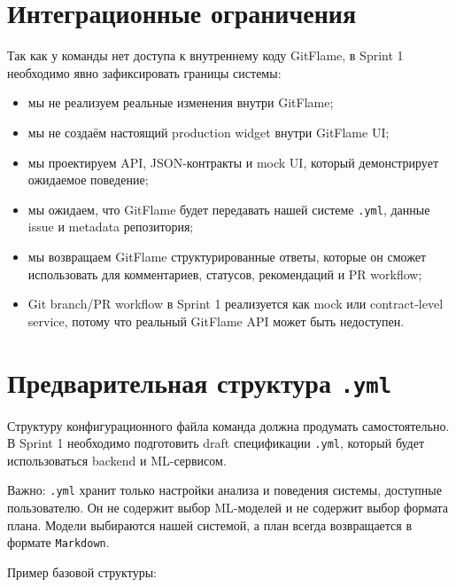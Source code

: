 \documentclass[12pt,a4paper]{article}
\begin{document}
\section{Интеграционные ограничения}

Так как у команды нет доступа к внутреннему коду GitFlame, в Sprint 1 необходимо явно зафиксировать границы системы:

\begin{itemize}
    \item мы не реализуем реальные изменения внутри GitFlame;
    \item мы не создаём настоящий production widget внутри GitFlame UI;
    \item мы проектируем API, JSON-контракты и mock UI, который демонстрирует ожидаемое поведение;
    \item мы ожидаем, что GitFlame будет передавать нашей системе \texttt{.yml}, данные issue и metadata репозитория;
    \item мы возвращаем GitFlame структурированные ответы, которые он сможет использовать для комментариев, статусов, рекомендаций и PR workflow;
    \item Git branch/PR workflow в Sprint 1 реализуется как mock или contract-level service, потому что реальный GitFlame API может быть недоступен.
\end{itemize}

\section{Предварительная структура \texttt{.yml}}

Структуру конфигурационного файла команда должна продумать самостоятельно. В Sprint 1 необходимо подготовить draft спецификации \texttt{.yml}, который будет использоваться backend и ML-сервисом.

Важно: \texttt{.yml} хранит только настройки анализа и поведения системы, доступные пользователю. Он не содержит выбор ML-моделей и не содержит выбор формата плана. Модели выбираются нашей системой, а план всегда возвращается в формате \texttt{Markdown}.

Пример базовой структуры:
\end{document}
